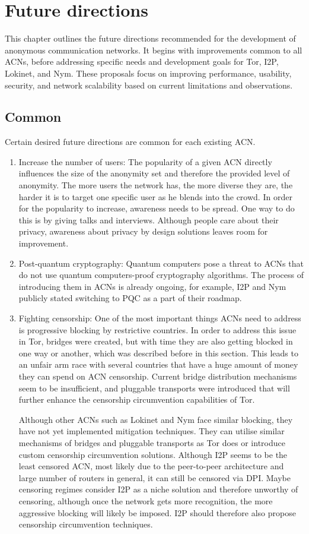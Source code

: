 \chapter{Future directions}
This chapter outlines the future directions recommended for the development of anonymous communication networks. It begins with improvements common to all ACNs, before addressing specific needs and development goals for Tor, I2P, Lokinet, and Nym. These proposals focus on improving performance, usability, security, and network scalability based on current limitations and observations.

\section{Common}
Certain desired future directions are common for each existing ACN.
\begin{enumerate}
    \item Increase the number of users: The popularity of a given ACN directly influences the size of the anonymity set and therefore the provided level of anonymity. The more users the network has, the more diverse they are, the harder it is to target one specific user as he blends into the crowd. In order for the popularity to increase, awareness needs to be spread. One way to do this is by giving talks and interviews. Although people care about their privacy, awareness about privacy by design solutions leaves room for improvement.
    \item Post-quantum cryptography: Quantum computers pose a threat to ACNs that do not use quantum computers-proof cryptography algorithms. The process of introducing them in ACNs is already ongoing, for example, I2P and Nym publicly stated switching to PQC as a part of their roadmap.
    \item Fighting censorship: One of the most important things ACNs need to address is progressive blocking by restrictive countries. In order to address this issue in Tor, bridges were created, but with time they are also getting blocked in one way or another, which was described before in this section. This leads to an unfair arm race with several countries that have a huge amount of money they can spend on ACN censorship. Current bridge distribution mechanisms seem to be insufficient, and pluggable transports were introduced that will further enhance the censorship circumvention capabilities of Tor.
    
    Although other ACNs such as Lokinet and Nym face similar blocking, they have not yet implemented mitigation techniques. They can utilise similar mechanisms of bridges and pluggable transports as Tor does or introduce custom censorship circumvention solutions. Although I2P seems to be the least censored ACN, most likely due to the peer-to-peer architecture and large number of routers in general, it can still be censored via DPI. Maybe censoring regimes consider I2P as a niche solution and therefore unworthy of censoring, although once the network gets more recognition, the more aggressive blocking will likely be imposed. I2P should therefore also propose censorship circumvention techniques.
\end{enumerate}

